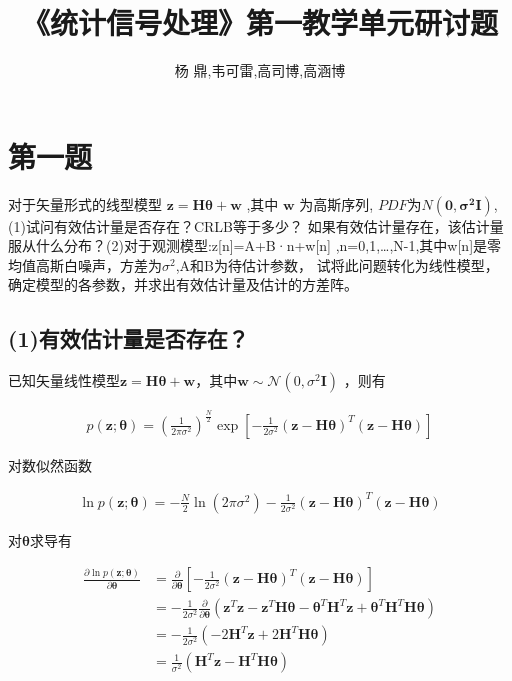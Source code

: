 \documentclass[fontset=windows]{article}
\title{\heiti\zihao{2} 《统计信号处理》第一教学单元研讨题}
\author{杨 鼎,韦可雷,高司博,高涵博}
\date{}
\numberwithin{figure}{section}
\begin{document}
\maketitle
\thispagestyle{empty}


\tableofcontents
\setcounter{page}{0}
\newpage

\section{第一题}
对于矢量形式的线型模型 \(\mathbf{z=H}\boldsymbol{\theta}+\mathbf{w}\) ,其中 \(\mathbf{w}\) 为高斯序列,
\(PDF\)为\(N(\mathbf{0,\sigma^2I})\),(1)试问有效估计量是否存在？CRLB等于多少？
如果有效估计量存在，该估计量服从什么分布？(2)对于观测模型:z[n]=A+B·n+w[n]
,n=0,1,…,N-1,其中w[n]是零均值高斯白噪声，方差为\(\sigma^2\),A和B为待估计参数，
试将此问题转化为线性模型，确定模型的各参数，并求出有效估计量及估计的方差阵。

\subsection*{(1)有效估计量是否存在？}

已知矢量线性模型\(\mathbf{z=H}\boldsymbol{\theta}+\mathbf{w}\)，其中\(\mathbf{w}\sim \mathcal{N} (0,\sigma^2 \mathbf{I})\)
，则有

\begin{align*}
	p(\mathbf{z};\boldsymbol{\theta})=(\frac{1}{2\pi \sigma^2})^{\frac{N}{2}}
	\exp\left[-\frac{1}{2\sigma^2}(\mathbf{z-H\boldsymbol{\theta}})^T
		(\mathbf{z-H\boldsymbol{\theta}})\right]
\end{align*}

对数似然函数

\begin{align*}
	\ln p(\mathbf{z};\boldsymbol{\theta})=-{\frac{N}{2}}\ln (2\pi \sigma^2)
	-\frac{1}{2\sigma^2}(\mathbf{z-H}\boldsymbol{\theta})^T(\mathbf{z-H}\boldsymbol{\theta})
\end{align*}

对\(\boldsymbol{\theta}\)求导有

\begin{align*}
	\frac{\partial \ln p(\mathbf{z};\boldsymbol{\theta})}{\partial \boldsymbol{\theta}}
	 & =\frac{\partial}{\partial \boldsymbol{\theta}}\left[-\frac{1}{2\sigma^2}
	(\mathbf{z-H}\boldsymbol{\theta})^T(\mathbf{z-H}\boldsymbol{\theta})\right]                               \\
	 & = -\frac{1}{2\sigma^2}\frac{\partial}{\partial \boldsymbol{\theta}}\left(\mathbf{z}^T\mathbf{z}
	-\mathbf{z}^T\mathbf{H}\boldsymbol{\theta}-\boldsymbol{\theta}^T\mathbf{H}^T\mathbf{z}+
	\boldsymbol{\theta}^T\mathbf{H}^T\mathbf{H}\boldsymbol{\theta}\right)                                     \\
	 & =-\frac{1}{2\sigma^2}\left(-2\mathbf{H}^T\mathbf{z}+2\mathbf{H}^T\mathbf{H}\boldsymbol{\theta} \right) \\
	 & =\frac{1}{\sigma^2}\left(\mathbf{H}^T\mathbf{z}-\mathbf{H}^T\mathbf{H}\boldsymbol{\theta} \right)
\end{align*}
\end{document}
